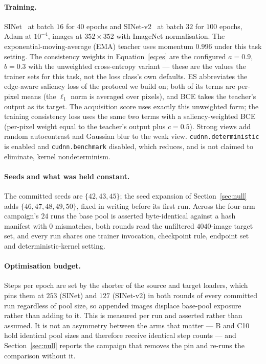 \documentclass{article}
\begin{document}
\paragraph{Training.} SINet~\citep{fan2020sinet} at batch $16$ for $40$ epochs and
SINet-v2~\citep{fan2022concealed} at batch $32$ for $100$ epochs, Adam at $10^{-4}$, images at
$352 \times 352$ with ImageNet normalisation. The exponential-moving-average (EMA) teacher uses momentum $0.996$ under this task
setting. The consistency weights in Equation~\ref{eq:es} are the configured $a = 0.9$, $b = 0.3$
with the unweighted cross-entropy variant --- these are the values the trainer sets for this task,
not the loss class's own defaults. ES abbreviates the edge-aware saliency loss of the protocol we
build on; both of its terms are per-pixel means (the $\ell_1$ norm is averaged over pixels), and BCE
takes the teacher's output as its target. The acquisition score uses exactly this unweighted form;
the training consistency loss uses the same two terms with a saliency-weighted BCE (per-pixel weight
equal to the teacher's output plus $c = 0.5$). Strong views add random autocontrast and Gaussian blur to the
weak view. \texttt{cudnn.deterministic} is enabled and \texttt{cudnn.benchmark} disabled, which
reduces, and is not claimed to eliminate, kernel nondeterminism.

\paragraph{Seeds and what was held constant.} The committed seeds are $\{42, 43, 45\}$; the seed
expansion of Section~\ref{sec:null} adds $\{46, 47, 48, 49, 50\}$, fixed in writing before its first
run. Across the four-arm campaign's $24$ runs the base pool is asserted byte-identical against a
hash manifest with $0$ mismatches, both rounds read the unfiltered $4040$-image target set, and
every run shares one trainer invocation, checkpoint rule, endpoint set and deterministic-kernel
setting.

\paragraph{Optimisation budget.} Steps per epoch are set by the shorter of the source and target
loaders, which pins them at $253$ (SINet) and $127$ (SINet-v2) in both rounds of every committed run
regardless of pool size, so appended images displace base-pool exposure rather than adding to it.
This is measured per run and asserted rather than assumed. It is not an asymmetry between the arms
that matter --- B and C10 hold identical pool sizes and therefore receive identical step counts ---
and Section~\ref{sec:null} reports the campaign that removes the pin and re-runs the comparison
without it.
\end{document}
